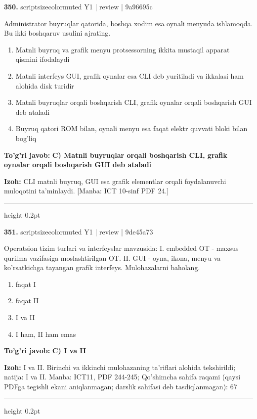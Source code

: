 \documentclass[10pt,a4paper]{article}
\begin{document}
{\bfseries\sffamily\color{ink} 350.} {scriptsizecolor{muted} Y1 | review | 9a96695c}
\par
Administrator buyruqlar qatorida, boshqa xodim esa oynali menyuda ishlamoqda. Bu ikki boshqaruv usulini ajrating.
\begin{enumerate}[label=\Alph*),leftmargin=9mm]
\item Matnli buyruq va grafik menyu protsessorning ikkita mustaqil apparat qismini ifodalaydi
\item Matnli interfeys GUI, grafik oynalar esa CLI deb yuritiladi va ikkalasi ham alohida disk turidir
\item Matnli buyruqlar orqali boshqarish CLI, grafik oynalar orqali boshqarish GUI deb ataladi
\item Buyruq qatori ROM bilan, oynali menyu esa faqat elektr quvvati bloki bilan bog'liq
\end{enumerate}
\begin{tcolorbox}[enhanced,breakable,colback=teal!4,colframe=teal!60!black,boxrule=0.45pt,arc=1.2mm,left=2.7mm,right=2.7mm,top=1.8mm,bottom=1.8mm,before skip=2mm,after skip=2mm]
{\bfseries\sffamily\color{teal}To'g'ri javob:} \textbf{C) Matnli buyruqlar orqali boshqarish CLI, grafik oynalar orqali boshqarish GUI deb ataladi}
\par\smallskip
{\bfseries Izoh:} CLI matnli buyruq, GUI esa grafik elementlar orqali foydalanuvchi muloqotini ta'minlaydi. [Manba: ICT 10-sinf PDF 24.]
\end{tcolorbox}
\vspace{2mm}\hrule height 0.2pt\vspace{3mm}

{\bfseries\sffamily\color{ink} 351.} {scriptsizecolor{muted} Y1 | review | 9de45a73}
\par
Operatsion tizim turlari va interfeyslar mavzusida: I. embedded OT - maxsus qurilma vazifasiga moslashtirilgan OT. II. GUI - oyna, ikona, menyu va ko'rsatkichga tayangan grafik interfeys. Mulohazalarni baholang.
\begin{enumerate}[label=\Alph*),leftmargin=9mm]
\item faqat I
\item faqat II
\item I va II
\item I ham, II ham emas
\end{enumerate}
\begin{tcolorbox}[enhanced,breakable,colback=teal!4,colframe=teal!60!black,boxrule=0.45pt,arc=1.2mm,left=2.7mm,right=2.7mm,top=1.8mm,bottom=1.8mm,before skip=2mm,after skip=2mm]
{\bfseries\sffamily\color{teal}To'g'ri javob:} \textbf{C) I va II}
\par\smallskip
{\bfseries Izoh:} I va II. Birinchi va ikkinchi mulohazaning ta'riflari alohida tekshirildi; natija: I va II. Manba: ICT11, PDF 244-245; Qo'shimcha sahifa raqami (qaysi PDFga tegishli ekani aniqlanmagan; darslik sahifasi deb tasdiqlanmagan): 67
\end{tcolorbox}
\vspace{2mm}\hrule height 0.2pt\vspace{3mm}
\end{document}
